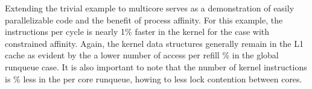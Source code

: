 \documentclass{cys}
\begin{document}
\begin{table}[h!]
    \centering
    \caption{multi core - cpu queue (affinity)}
\end{table}

Extending the trivial example to multicore serves as a demonstration of easily parallelizable code and the benefit of process affinity.  For this example, the instructions per cycle is nearly 1\% faster in the kernel for the case with constrained affinity.  Again, the kernel data structures generally remain in the L1 cache as evident by the a lower number of access per refill \% in the global runqueue case.  It is also important to note that the number of kernel instructions is \% less in the per core runqueue, howing to less lock contention between cores.

\begin{table}[h!]
    \centering
    \caption{death - no pull sm}
\end{table}
\end{document}
